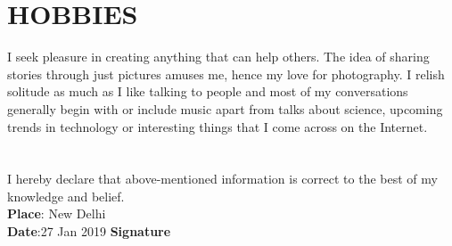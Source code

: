 \documentclass[margin, 10pt]{res}
\begin{document}
\begin{resume}
    
    \section{HOBBIES}
    I seek pleasure in creating anything that can help others. The idea of sharing stories through just pictures amuses me, hence my love for photography. I relish solitude as much as I like talking to people and most of my conversations generally begin with or include music apart from talks about science, upcoming trends in technology or interesting things that I come across on the Internet.
    \\

    \section{}
    I hereby declare that above-mentioned information is correct to the best of my knowledge and belief.\\

    {\bf Place}: New Delhi\\
    {\bf Date}:27 Jan 2019 \null\hfill {\bf Signature}\\
    \end{resume}
    
\end{document}
